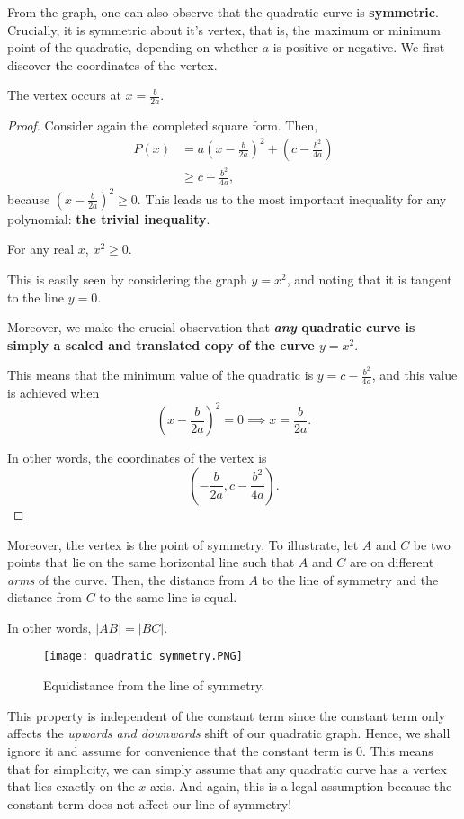 \documentclass[../jarvis.tex]{subfiles}
\begin{document}
From the graph, one can also observe that the quadratic curve is \textbf{symmetric}. Crucially, it is symmetric about it's vertex, that is, the maximum or minimum point of the quadratic, depending on whether $a$ is positive or negative. We first discover the coordinates of the vertex.
\begin{proposition}
    The vertex occurs at $x=\frac{b}{2a}$.
\end{proposition}
\begin{proof}
    Consider again the completed square form. Then,
   \begin{align*}
        P(x)&=a\left(x-\frac{b}{2a}\right)^2+\left(c-\frac{b^2}{4a}\right) \\
        &\geq c-\frac{b^2}{4a},
   \end{align*}
   because $\left(x-\frac{b}{2a}\right)^2\geq 0$. This leads us to the most important inequality for any polynomial: \textbf{the trivial inequality}.
   \begin{proposition}
       For any real $x$, $x^2\geq 0$.
   \end{proposition}
   This is easily seen by considering the graph $y=x^2$, and noting that it is tangent to the line $y=0$. 
   
   Moreover, we make the crucial observation that \textbf{\textit{any} quadratic curve is simply a scaled and translated copy of the curve $y=x^2$}.

   This means that the minimum value of the quadratic is $y=c-\frac{b^2}{4a}$, and this value is achieved when $$\left(x-\frac{b}{2a}\right)^2=0 \implies x=\frac{b}{2a}.$$

   In other words, the coordinates of the vertex is $$\left(-\frac{b}{2a},c-\frac{b^2}{4a}\right).$$
\end{proof}
Moreover, the vertex is the point of symmetry. To illustrate, let $A$ and $C$ be two points that lie on the same horizontal line such that $A$ and $C$ are on different \textit{arms} of the curve. Then, the distance from $A$ to the line of symmetry and the distance from $C$ to the same line is equal.

In other words, $|AB|=|BC|$.
\begin{figure}[H]
    \centering
    \texttt{[image: quadratic\_symmetry.PNG]}
    \caption{Equidistance from the line of symmetry.}
\end{figure}

This property is independent of the constant term since the constant term only affects the \textit{upwards and downwards} shift of our quadratic graph. Hence, we shall ignore it and assume for convenience that the constant term is $0$. This means that for simplicity, we can simply assume that any quadratic curve has a vertex that lies exactly on the $x$-axis. And again, this is a legal assumption because the constant term does not affect our line of symmetry!
\end{document}
